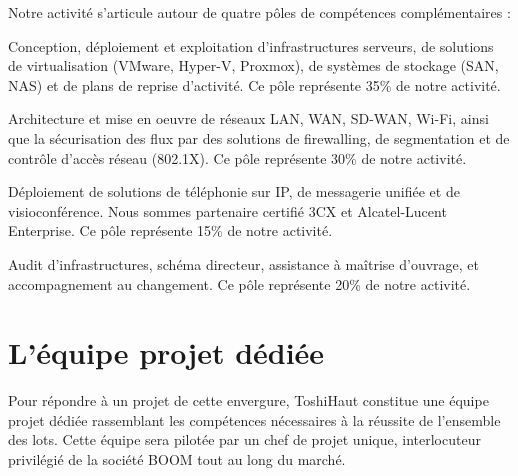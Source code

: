 \documentclass[12pt,a4paper]{report}
\begin{document}
Notre activité s'articule autour de quatre pôles de compétences complémentaires :

\begin{description}[style=nextline]
\item[Pôle Infrastructure et Datacenter] Conception, déploiement et exploitation d'infrastructures serveurs, de solutions de virtualisation (VMware, Hyper-V, Proxmox), de systèmes de stockage (SAN, NAS) et de plans de reprise d'activité. Ce pôle représente 35\% de notre activité.

\item[Pôle Réseau et Sécurité] Architecture et mise en oeuvre de réseaux LAN, WAN, SD-WAN, Wi-Fi, ainsi que la sécurisation des flux par des solutions de firewalling, de segmentation et de contrôle d'accès réseau (802.1X). Ce pôle représente 30\% de notre activité.

\item[Pôle Téléphonie et Communications Unifiées] Déploiement de solutions de téléphonie sur IP, de messagerie unifiée et de visioconférence. Nous sommes partenaire certifié 3CX et Alcatel-Lucent Enterprise. Ce pôle représente 15\% de notre activité.

\item[Pôle Conseil et Accompagnement] Audit d'infrastructures, schéma directeur, assistance à maîtrise d'ouvrage, et accompagnement au changement. Ce pôle représente 20\% de notre activité.
\end{description}

\section{L'équipe projet dédiée}

Pour répondre à un projet de cette envergure, ToshiHaut constitue une équipe projet dédiée rassemblant les compétences nécessaires à la réussite de l'ensemble des lots. Cette équipe sera pilotée par un chef de projet unique, interlocuteur privilégié de la société BOOM tout au long du marché.
\end{document}
